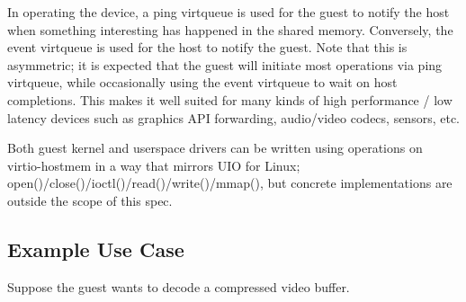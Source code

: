 In operating the device, a ping virtqueue is used for the guest to notify the host
when something interesting has happened in the shared memory.
Conversely, the event virtqueue is used for the host to notify the guest.
Note that this is asymmetric;
it is expected that the guest will initiate most operations via ping virtqueue,
while occasionally using the event virtqueue to wait on host completions.
This makes it well suited for many kinds of high performance / low latency
devices such as graphics API forwarding, audio/video codecs, sensors, etc.

Both guest kernel and userspace drivers can be written using operations
on virtio-hostmem in a way that mirrors UIO for Linux;
open()/close()/ioctl()/read()/write()/mmap(),
but concrete implementations are outside the scope of this spec.

\subsection{Example Use Case}\label{sec:Device Types / Host Memory Device / Example Use Case}

Suppose the guest wants to decode a compressed video buffer.

